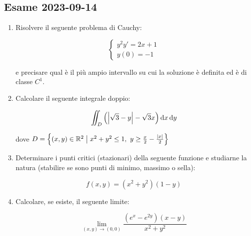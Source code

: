 \subsection{Esame 2023{-}09{-}14}

\begin{enumerate}
    \itemsep32pt
    \item Risolvere il seguente problema di Cauchy:

          \begin{equation*}
              \begin{cases}
                  y^2y' = 2x +1 \\
                  y(0) = -1
              \end{cases}
          \end{equation*}

          e precisare qual è il più ampio intervallo su cui la soluzione è definita ed è di classe \(C^1\).

    \item Calcolare il seguente integrale doppio:

          \[
              \iint_{D} \left(\left|\sqrt{3}-y\right|-\sqrt{3}x\right) \mathop{}\!\mathrm{d}{x}\mathop{}\!\mathrm{d}{y}
          \]

          dove \(D = \left\{ (x,y) \in \mathbb{R}^{2} \;\big|\; x^2+y^2 \le 1,\ y \ge \frac{x}{2} - \frac{|x|}{2} \right\} \)

    \item Determinare i punti critici (stazionari) della seguente funzione e studiarne la natura (stabilire se sono punti di minimo, massimo o sella):

          \[
              f(x,y) = (x^2+y^2)(1-y)
          \]

    \item Calcolare, se esiste, il seguente limite:

          \[
              \lim_{(x,y) \rightarrow (0,0)}
              \frac
              {(e^x-e^{2y})(x-y)}
              {x^2 + y^2}
          \]

\end{enumerate}
